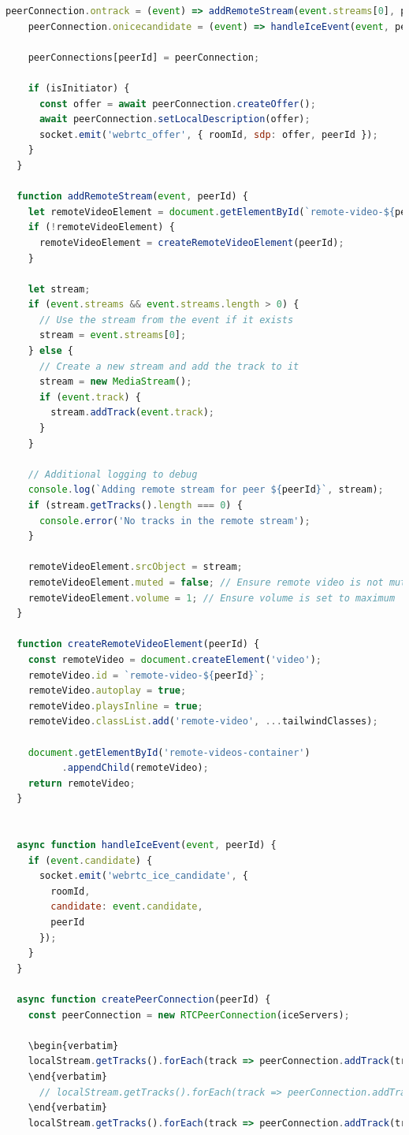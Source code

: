 \documentclass[12pt, a4paper, oneside]{Thesis}
\begin{document}
\begin{lstlisting}[language=JavaScript, caption={Fonctions Principales}, label=Fonctions Principales]
    peerConnection.ontrack = (event) => addRemoteStream(event.streams[0], peerId);
    peerConnection.onicecandidate = (event) => handleIceEvent(event, peerId);

    peerConnections[peerId] = peerConnection;

    if (isInitiator) {
      const offer = await peerConnection.createOffer();
      await peerConnection.setLocalDescription(offer);
      socket.emit('webrtc_offer', { roomId, sdp: offer, peerId });
    }
  }

  function addRemoteStream(event, peerId) {
    let remoteVideoElement = document.getElementById(`remote-video-${peerId}`);
    if (!remoteVideoElement) {
      remoteVideoElement = createRemoteVideoElement(peerId);
    }

    let stream;
    if (event.streams && event.streams.length > 0) {
      // Use the stream from the event if it exists
      stream = event.streams[0];
    } else {
      // Create a new stream and add the track to it
      stream = new MediaStream();
      if (event.track) {
        stream.addTrack(event.track);
      }
    }

    // Additional logging to debug
    console.log(`Adding remote stream for peer ${peerId}`, stream);
    if (stream.getTracks().length === 0) {
      console.error('No tracks in the remote stream');
    }

    remoteVideoElement.srcObject = stream;
    remoteVideoElement.muted = false; // Ensure remote video is not muted
    remoteVideoElement.volume = 1; // Ensure volume is set to maximum
  }

  function createRemoteVideoElement(peerId) {
    const remoteVideo = document.createElement('video');
    remoteVideo.id = `remote-video-${peerId}`;
    remoteVideo.autoplay = true;
    remoteVideo.playsInline = true;
    remoteVideo.classList.add('remote-video', ...tailwindClasses);

    document.getElementById('remote-videos-container')
          .appendChild(remoteVideo);
    return remoteVideo;
  }


  async function handleIceEvent(event, peerId) {
    if (event.candidate) {
      socket.emit('webrtc_ice_candidate', {
        roomId,
        candidate: event.candidate,
        peerId
      });
    }
  }

  async function createPeerConnection(peerId) {
    const peerConnection = new RTCPeerConnection(iceServers);

    \begin{verbatim}
    localStream.getTracks().forEach(track => peerConnection.addTrack(track, localStream));
    \end{verbatim}
      // localStream.getTracks().forEach(track => peerConnection.addTrack(track, localStream));
    \end{verbatim}
    localStream.getTracks().forEach(track => peerConnection.addTrack(track, localStream));


\end{lstlisting}
\end{document}
